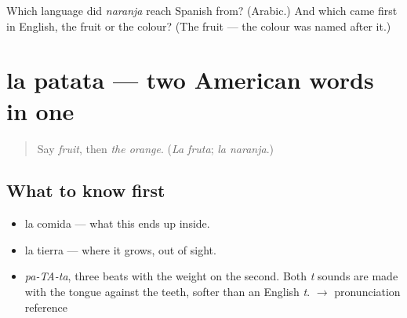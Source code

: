 \begin{tcolorbox}[breakable,colback=teal!4,colframe=teal!35!black,title={Before you move on}]
Which language did \emph{naranja} reach Spanish from? (Arabic.) And which came first in English, the fruit or the colour? (The fruit — the colour was named after it.)
\end{tcolorbox}
\section[la patata]{la patata — two American words in one}

\label{lesson:ES-C367-patata}



\begin{quote}
Say \emph{fruit}, then \emph{the orange}. (\emph{La fruta}; \emph{la naranja}.)
\end{quote}

\subsection*{What to know first}
\begin{itemize}
\raggedright
  \item la comida — what this ends up inside.
  \item la tierra — where it grows, out of sight.
\end{itemize}

\begin{sounds}
\begin{itemize}
\raggedright
  \item \emph{pa-TA-ta}, three beats with the weight on the second. Both \emph{t} sounds are made with the tongue against the teeth, softer than an English \emph{t}. $\to$ pronunciation reference
\end{itemize}
\end{sounds}

